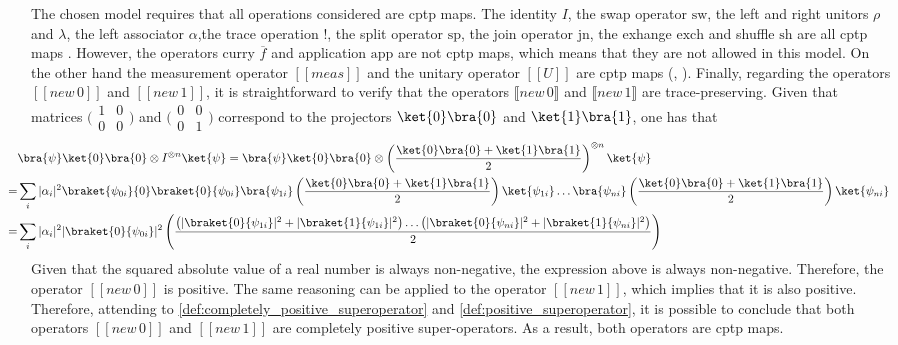 The chosen model requires that all operations considered are \acrshort{cptp} maps. The identity $I$, the swap operator $\text{sw}$, the left and right unitors $\rho$ and $\lambda$, the left associator $\alpha$,the trace operation $!$, the split operator $\text{sp}$, the join operator $\text{jn}$, the exhange $\text{exch}$ and shuffle $\text{sh}$ are all  \acrshort{cptp} maps \cite{dahlqvist2022syntactic}. However, the operators curry $\overline{f}$ and application $\text{app}$ are not \acrshort{cptp} maps, which means that they are not allowed in this model. On the other hand the measurement operator $[\![\textit{meas}]\!]$ and the unitary operator $[\![\textit{U}]\!]$ are \acrshort{cptp} maps (, \cite[page 73]{watrous2018theory}). Finally, regarding the operators  $[\![\textit{new} \,0 ]\!]$ and $[\![\textit{new} \, 1 ] \!]$, it is straightforward to verify that the operators $ \llbracket \textit{new} \, 0 \rrbracket $ and $\llbracket\textit{new} \, 1 \rrbracket$ are trace-preserving. Given that matrices $\big(\begin{smallmatrix} 1 & 0\\ 0 & 0 \end{smallmatrix}\big)$ and $\big(\begin{smallmatrix} 0 & 0\\ 0 & 1 \end{smallmatrix}\big)$ correspond to the projectors $\ket{0}\bra{0}$ and $\ket{1}\bra{1}$, one has that 
\begin{align*}
  \hspace{-20pt} &  \bra{\psi} \ket{0}\bra{0} \otimes I^{\otimes n} \ket{\psi}  = \bra{\psi} \ket{0}\bra{0} \otimes \left(\frac{\ket{0}\bra{0} + \ket{1}\bra{1}}{2}\right)^{\otimes n} \ket{\psi} \\
  \hspace{-20pt} =  &  \sum_{i} |\alpha_i|^{2} \braket{\psi_{0i}}{0}\braket{0}{\psi_{0i}} \bra{\psi_{1i}} \left(\frac{\ket{0}\bra{0} + \ket{1}\bra{1}}{2}\right)\ket{\psi_{1i}} \ldots \bra{\psi_{ni}} \left(\frac{\ket{0}\bra{0} + \ket{1}\bra{1}}{2}\right)\ket{\psi_{ni}}   \\
  \hspace{-20pt} = & \sum_{i}  |\alpha_i|^{2} |\braket{0}{\psi_{0i}}|^{2} \left( \frac{ \left( |\braket{0}{\psi_{1i}}|^{2} +  |\braket{1}{\psi_{1i}}|^{2} \right) \ldots \left( |\braket{0}{\psi_{ni}}|^{2} +  |\braket{1}{\psi_{ni}}|^{2} \right) }{2}  \right)    \\
\end{align*}
Given that the squared absolute value of a real number is always non-negative, the expression above is always non-negative. Therefore, the operator $[\![\textit{new} \,0 ]\!]$ is positive. The same reasoning can be applied to the operator $[\![\textit{new} \,1 ]\!]$, which implies that it is also positive. Therefore, attending to \autoref{def:completely_positive_superoperator} and \autoref{def:positive_superoperator}, it is possible to conclude that both operators $[\![\textit{new} \,0 ]\!]$ and $[\![\textit{new} \, 1 ] \!]$ are completely positive super-operators. As a result, both operators are \acrshort{cptp} maps.
